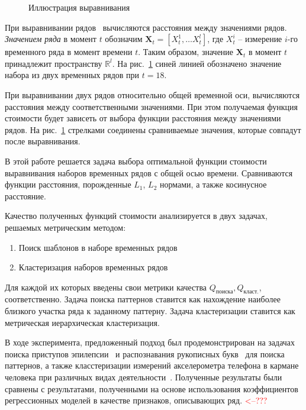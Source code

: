 \documentclass[12pt,twoside]{article}
\newcommand{\fixme}[1]{\textcolor{red}{#1}}
\begin{document}
        \begin{figure}[h!]
            \centering
            {
              \fontsize{11pt}{1pt}\selectfont
               \def\svgwidth{0.95\textwidth}
               
            }
            \caption{Иллюстрация выравнивания}\label{example}
        \end{figure}
        
        При выравнивании рядов~\cite{Sanguansat2012MultipleMS} вычисляются расстояния между значениями рядов. \textit{Значением ряда} в момент $t$ обозначим $\mathbf{X}_t = [X^1_t,\dots X^l_t]$, где $X^i_t$ \--- измерение $i$\--го временного ряда в момент времени $t$. Таким образом, значение $\mathbf{X}_t$ в момент $t$ принадлежит пространству $\mathbb{R}^{l}$.  На рис.~\ref{example} синей линией обозначено значение набора из двух временных рядов при $t=18$.
        
        При выравнивании двух рядов относительно общей временной оси, вычисляются расстояния между соответственными значениями. При этом получаемая функция стоимости будет зависеть от выбора функции расстояния между значениями рядов. На рис.~\ref{example} стрелками соединены сравниваемые значения, которые совпадут после выравнивания.

        В этой работе решается задача выбора оптимальной функции стоимости выравнивания наборов временных рядов с общей осью времени. Сравниваются функции расстояния, порожденные $L_1$, $L_2$ нормами, а также косинусное расстояние.
        
        Качество полученных функций стоимости анализируется в двух задачах, решаемых метрическим методом:
        \begin{enumerate}[label=\arabic*)]
            \item Поиск шаблонов в наборе временных рядов
            \item Кластеризация наборов временных рядов
        \end{enumerate}
        Для каждой их которых введены свои метрики качества $Q_\text{поиска}, Q_\text{класт.}$,  соответственно.
        Задача поиска паттернов ставится как нахождение наиболее близкого участка ряда к заданному паттерну. Задача кластеризации ставится как метрическая иерархическая кластеризация.
        
        В ходе эксперимента, предложенный подход был продемонстрирован на задачах поиска приступов эпилепсии~\cite{epi} и распознавания рукописных букв~\cite{characters} для поиска паттернов, а также класстеризации измерений акселерометра телефона в кармане человека при различных видах деятельности~\cite{Kwapisz:2011:ARU:1964897.1964918}. Полученные результаты были сравнены с результатами, полученными на основе использования коэффициентов регрессионных моделей в качестве признаков, описывающих ряд. \fixme{<--???}
    
\end{document}
